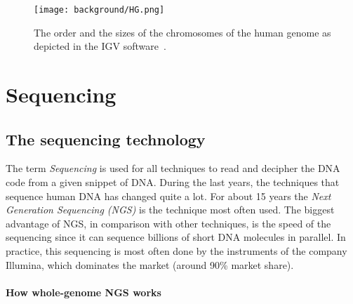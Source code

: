 \begin{figure}[H]
	\centering
	\texttt{[image: background/HG.png]}
	\caption{The order and the sizes of the chromosomes of the human genome as depicted in the IGV software~\cite{IGV}.}
	\label{fig:HG}
\end{figure}

\section{Sequencing}

\subsection{The sequencing technology}

The term \emph{Sequencing} is used for all techniques to read and decipher the DNA code from a given snippet of DNA. During the last years, the techniques that sequence human DNA has changed quite a lot. For about 15 years the \emph{Next Generation Sequencing (NGS)} is the technique most often used. The biggest advantage of NGS, in comparison with other techniques, is the speed of the sequencing since it can sequence billions of short DNA molecules in parallel. In practice, this sequencing is most often done by the instruments of the company Illumina, which dominates the market (around 90\% market share).

\paragraph{How whole-genome NGS works}

